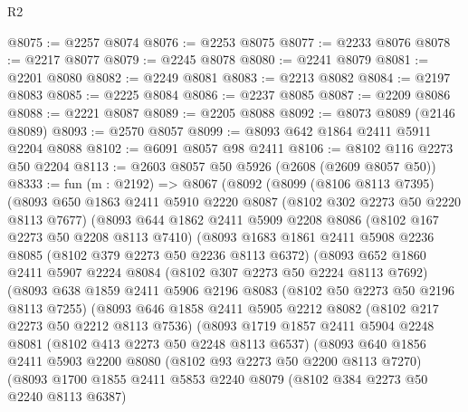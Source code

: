 \begin{lexlean}{R2}
\begin{coremodule}
@8075 := @2257 @8074
@8076 := @2253 @8075
@8077 := @2233 @8076
@8078 := @2217 @8077
@8079 := @2245 @8078
@8080 := @2241 @8079
@8081 := @2201 @8080
@8082 := @2249 @8081
@8083 := @2213 @8082
@8084 := @2197 @8083
@8085 := @2225 @8084
@8086 := @2237 @8085
@8087 := @2209 @8086
@8088 := @2221 @8087
@8089 := @2205 @8088
@8092 := @8073 @8089 (@2146 @8089)
@8093 := @2570 @8057
@8099 := @8093 @642 @1864 @2411 @5911 @2204 @8088
@8102 := @6091 @8057 @98 @2411
@8106 := @8102 @116 @2273 @50 @2204
@8113 := @2603 @8057 @50 @5926 (@2608 (@2609 @8057 @50))
@8333 := fun (m : @2192) =>
  @8067
    (@8092
      (@8099
        (@8106 @8113 @7395)
        (@8093
          @650
          @1863
          @2411
          @5910
          @2220
          @8087
          (@8102 @302 @2273 @50 @2220 @8113 @7677)
          (@8093
            @644
            @1862
            @2411
            @5909
            @2208
            @8086
            (@8102 @167 @2273 @50 @2208 @8113 @7410)
            (@8093
              @1683
              @1861
              @2411
              @5908
              @2236
              @8085
              (@8102 @379 @2273 @50 @2236 @8113 @6372)
              (@8093
                @652
                @1860
                @2411
                @5907
                @2224
                @8084
                (@8102 @307 @2273 @50 @2224 @8113 @7692)
                (@8093
                  @638
                  @1859
                  @2411
                  @5906
                  @2196
                  @8083
                  (@8102 @50 @2273 @50 @2196 @8113 @7255)
                  (@8093
                    @646
                    @1858
                    @2411
                    @5905
                    @2212
                    @8082
                    (@8102 @217 @2273 @50 @2212 @8113 @7536)
                    (@8093
                      @1719
                      @1857
                      @2411
                      @5904
                      @2248
                      @8081
                      (@8102 @413 @2273 @50 @2248 @8113 @6537)
                      (@8093
                        @640
                        @1856
                        @2411
                        @5903
                        @2200
                        @8080
                        (@8102 @93 @2273 @50 @2200 @8113 @7270)
                        (@8093
                          @1700
                          @1855
                          @2411
                          @5853
                          @2240
                          @8079
                          (@8102 @384 @2273 @50 @2240 @8113 @6387)

\end{coremodule}
\end{lexlean}
